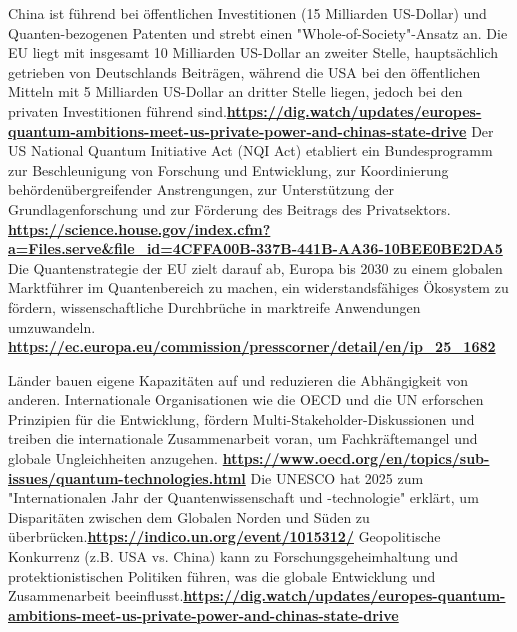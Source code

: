 China ist führend bei öffentlichen Investitionen (15 Milliarden US-Dollar) und Quanten-bezogenen Patenten und strebt einen "Whole-of-Society"-Ansatz an. Die EU liegt mit insgesamt 10 Milliarden US-Dollar an zweiter Stelle, hauptsächlich getrieben von Deutschlands Beiträgen, während die USA bei den öffentlichen Mitteln mit 5 Milliarden US-Dollar an dritter Stelle liegen, jedoch bei den privaten Investitionen führend sind.\textbf{\href{https://dig.watch/updates/europes-quantum-ambitions-meet-us-private-power-and-chinas-state-drive}{https://dig.watch/updates/europes-quantum-ambitions-meet-us-private-power-and-chinas-state-drive}} Der US National Quantum Initiative Act (NQI Act) etabliert ein Bundesprogramm zur Beschleunigung von Forschung und Entwicklung, zur Koordinierung behördenübergreifender Anstrengungen, zur Unterstützung der Grundlagenforschung und zur Förderung des Beitrags des Privatsektors. \textbf{\href{https://science.house.gov/index.cfm?a=Files.serve&file_id=4CFFA00B-337B-441B-AA36-10BEE0BE2DA5}{https://science.house.gov/index.cfm?a=Files.serve\&file\_id=4CFFA00B-337B-441B-AA36-10BEE0BE2DA5}} Die Quantenstrategie der EU zielt darauf ab, Europa bis 2030 zu einem globalen Marktführer im Quantenbereich zu machen, ein widerstandsfähiges Ökosystem zu fördern, wissenschaftliche Durchbrüche in marktreife Anwendungen umzuwandeln. \textbf{\href{https://ec.europa.eu/commission/presscorner/detail/en/ip_25_1682}{https://ec.europa.eu/commission/presscorner/detail/en/ip\_25\_1682}}

Länder bauen eigene Kapazitäten auf und reduzieren die Abhängigkeit von anderen. Internationale Organisationen wie die OECD und die UN erforschen Prinzipien für die Entwicklung, fördern Multi-Stakeholder-Diskussionen und treiben die internationale Zusammenarbeit voran, um Fachkräftemangel und globale Ungleichheiten anzugehen. \textbf{\href{https://www.oecd.org/en/topics/sub-issues/quantum-technologies.html}{https://www.oecd.org/en/topics/sub-issues/quantum-technologies.html}} Die UNESCO hat 2025 zum "Internationalen Jahr der Quantenwissenschaft und -technologie" erklärt, um Disparitäten zwischen dem Globalen Norden und Süden zu überbrücken.\textbf{\href{https://indico.un.org/event/1015312/}{https://indico.un.org/event/1015312/}} Geopolitische Konkurrenz (z.B. USA vs. China) kann zu Forschungsgeheimhaltung und protektionistischen Politiken führen, was die globale Entwicklung und Zusammenarbeit beeinflusst.\textbf{\href{https://dig.watch/updates/europes-quantum-ambitions-meet-us-private-power-and-chinas-state-drive}{https://dig.watch/updates/europes-quantum-ambitions-meet-us-private-power-and-chinas-state-drive}}


